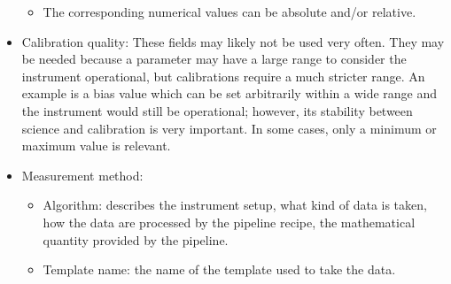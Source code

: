 \begin{itemize}
\begin{itemize}
        \item The corresponding numerical values can be absolute and/or relative.
    \end{itemize}
    \item Calibration quality: These fields may likely not be used very often. They may be needed because a parameter may have a large range to consider the instrument operational, but calibrations require a much stricter range. An example is a bias value which can be set arbitrarily within a wide range and the instrument would still be operational; however, its stability between science and calibration is very important. In some cases, only a minimum or maximum value is relevant.
    \item Measurement method:
    \begin{itemize}
        \item Algorithm: describes the instrument setup, what kind of data is taken, how the data are processed by the pipeline recipe, the mathematical quantity provided by the pipeline.
        \item Template name: the name of the template used to take the data.
    \end{itemize}
    \end{itemize}


